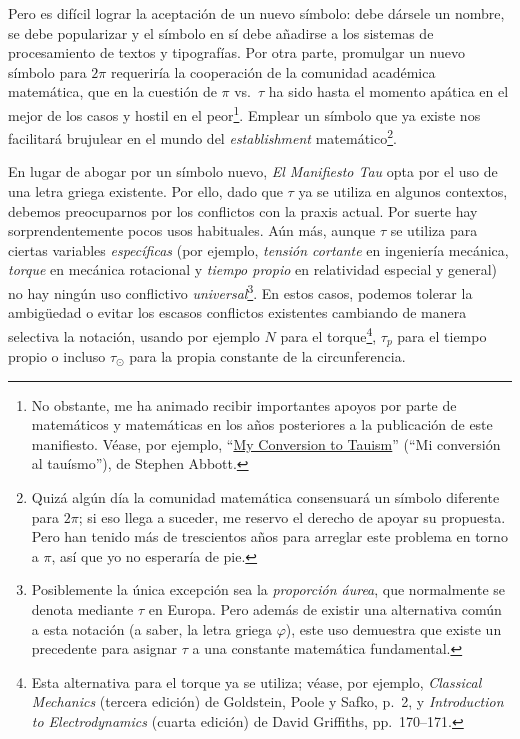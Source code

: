 Pero es difícil lograr la aceptación de un nuevo símbolo: debe dársele un nombre, se debe popularizar y el símbolo en sí debe añadirse a los sistemas de procesamiento de textos y tipografías. Por otra parte, promulgar un nuevo símbolo para $2\pi$ requeriría la cooperación de la comunidad académica matemática, que en la cuestión de $\pi$ vs.\ $\tau$ ha sido hasta el momento apática en el mejor de los casos y hostil en el peor\footnote{No obstante, me ha animado recibir importantes apoyos por parte de matemáticos y matemáticas en los años posteriores a la publicación de este manifiesto. Véase, por ejemplo, ``\href{https://www.maa.org/sites/default/files/pdf/Mathhorizons/apr12_aftermath.pdf}{My Conversion to Tauism}'' (``Mi conversión al tauísmo''), de Stephen Abbott.}. Emplear un símbolo que ya existe nos facilitará brujulear en el mundo del \emph{establishment} matemático\footnote{Quizá algún día la comunidad matemática consensuará un símbolo diferente para $2\pi$; si eso llega a suceder, me reservo el derecho de apoyar su propuesta. Pero han tenido más de trescientos años para arreglar este problema en torno a $\pi$, así que yo no esperaría de pie.}.

En lugar de abogar por un símbolo nuevo, \emph{El Manifiesto Tau} opta por el uso de una letra griega existente. Por ello, dado que $\tau$ ya se utiliza en algunos contextos, debemos preocuparnos por los conflictos con la praxis actual. Por suerte hay sorprendentemente pocos usos habituales. Aún más, aunque $\tau$ se utiliza para ciertas variables \emph{específicas} (por ejemplo, \emph{tensión cortante} en ingeniería mecánica, \emph{torque} en mecánica rotacional y \emph{tiempo propio} en relatividad especial y general) no hay ningún uso conflictivo \emph{universal}\footnote{Posiblemente la única excepción sea la \emph{proporción áurea}, que normalmente se denota mediante $\tau$ en Europa. Pero además de existir una alternativa común a esta notación (a saber, la letra griega $\varphi$), este uso demuestra que existe un precedente para asignar $\tau$ a una constante matemática fundamental.}. En estos casos, podemos tolerar la ambigüedad o evitar los escasos conflictos existentes cambiando de manera selectiva la notación, usando por ejemplo $N$ para el torque\footnote{Esta alternativa para el torque ya se utiliza; véase, por ejemplo, \emph{Classical Mechanics} (tercera edición) de Goldstein, Poole y Safko, p.~2, y \emph{Introduction to Electrodynamics} (cuarta edición) de David Griffiths, pp.~170–171.}, $\tau_p$ para el tiempo propio o incluso $\tau_\odot$ para la propia constante de la circunferencia.

